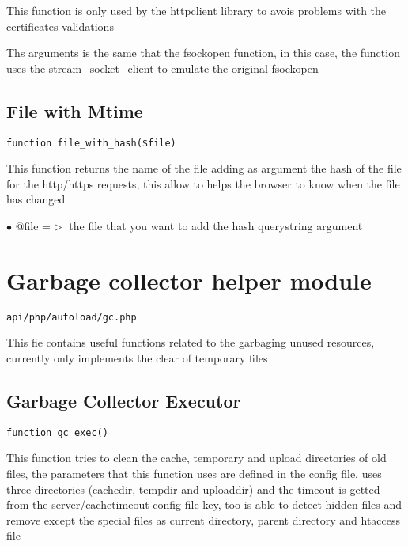 \documentclass[a4paper]{book}
\begin{document}
This function is only used by the httpclient library to avois problems with
the certificates validations

Ths arguments is the same that the fsockopen function, in this case, the
function uses the stream\_socket\_client to emulate the original fsockopen

\hypertarget{toc139}{}
\subsection{File with Mtime}

\begin{lstlisting}
function file_with_hash($file)
\end{lstlisting}

This function returns the name of the file adding as argument the hash
of the file for the http/https requests, this allow to helps the browser
to know when the file has changed

\begin{compactitem}
\item[\color{myblue}$\bullet$] @file =$>$ the file that you want to add the hash querystring argument
\end{compactitem}

\hypertarget{toc140}{}
\section{Garbage collector helper module}

\begin{lstlisting}
api/php/autoload/gc.php
\end{lstlisting}

This fie contains useful functions related to the garbaging unused resources, currently only
implements the clear of temporary files

\hypertarget{toc141}{}
\subsection{Garbage Collector Executor}

\begin{lstlisting}
function gc_exec()
\end{lstlisting}

This function tries to clean the cache, temporary and upload directories
of old files, the parameters that this function uses are defined in the
config file, uses three directories (cachedir, tempdir and uploaddir) and
the timeout is getted from the server/cachetimeout config file key, too
is able to detect hidden files and remove except the special files as
current directory, parent directory and htaccess file
\end{document}
